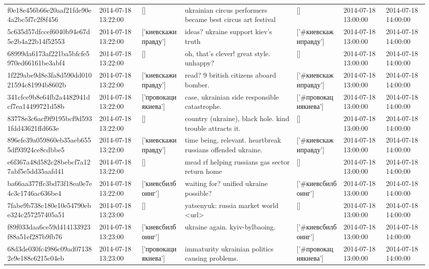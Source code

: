 \begin{tabular}{lllllll}
f0e18e456b66e20aaf21fde90e4a2bc5f7c2f8f456 & 2014-07-18 13:22:00 & [] & ukrainian circus performers became best circus art festival & [] & 2014-07-18 13:00:00 & 2014-07-18 14:00:00 \\
5c635d57dfccef6040b94e67d5e2b4a22b14f52553 & 2014-07-18 13:22:00 & ['киевскажиправду'] & ideas? ukraine support kiev's truth & ['#киевскажиправду'] & 2014-07-18 13:00:00 & 2014-07-18 14:00:00 \\
68999da6173af221ba5bfcfe5970ed66161be3abf4 & 2014-07-18 13:22:00 & [] & oh, that's clever! great style. unhappy? & [] & 2014-07-18 13:00:00 & 2014-07-18 14:00:00 \\
1f229abe9d8e3fa8d590dd01021594c81994b8602b & 2014-07-18 13:22:00 & ['киевскажиправду'] & read? 9 british citizens aboard bomber. & ['#киевскажиправду'] & 2014-07-18 13:00:00 & 2014-07-18 14:00:00 \\
341cfce9b8e64fb2a4482941dcf7ea14499721d58b & 2014-07-18 13:22:00 & ['провокациякиева'] & case, ukrainian side responsible catastrophe. & ['#провокациякиева'] & 2014-07-18 13:00:00 & 2014-07-18 14:00:00 \\
83778e3c6acf9f9195bcf9d5931fdd43621ffd663e & 2014-07-18 13:22:00 & [] & country (ukraine), black hole. kind trouble attracts it. & [] & 2014-07-18 13:00:00 & 2014-07-18 14:00:00 \\
896efe39a059860eb35aeb6555df93924ce8cdbbe5 & 2014-07-18 13:22:00 & ['киевскажиправду'] & time being, relevant. heartbreak russians offended ukraine. & ['#киевскажиправду'] & 2014-07-18 13:00:00 & 2014-07-18 14:00:00 \\
e6f367a48d582c28bebcf7a127abf5e5dd35aafd41 & 2014-07-18 13:22:00 & [] & mead rf helping russians gas sector return home & [] & 2014-07-18 13:00:00 & 2014-07-18 14:00:00 \\
ba66aa377ffc3bd73f18ea0e7e4c3c1746ac636be4 & 2014-07-18 13:22:00 & ['киевсбилбоинг'] & waiting for? unified ukraine possible? & ['#киевсбилбоинг'] & 2014-07-18 13:00:00 & 2014-07-18 14:00:00 \\
7fabe9b738c180e10e54790ebe324c257257405a51 & 2014-07-18 13:23:00 & [] & yatsenyuk: russia market world <url> & [] & 2014-07-18 13:00:00 & 2014-07-18 14:00:00 \\
f89f033daa6ce59d414133923f88a51ef287b9fb76 & 2014-07-18 13:23:00 & ['киевсбилбоинг'] & ukraine again. kyiv-bylbaoing. & ['#киевсбилбоинг'] & 2014-07-18 13:00:00 & 2014-07-18 14:00:00 \\
68d3de030fc4986c09ad071382e9e188c6215c04eb & 2014-07-18 13:23:00 & ['провокациякиева'] & immaturity ukrainian politics causing problems. & ['#провокациякиева'] & 2014-07-18 13:00:00 & 2014-07-18 14:00:00 \\

\end{tabular}
